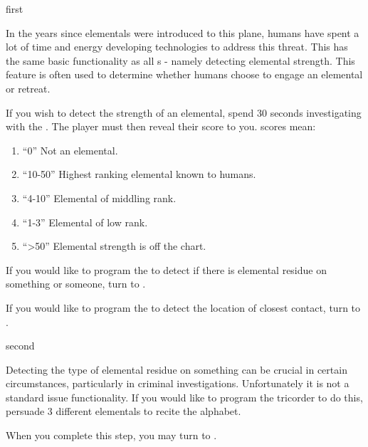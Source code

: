 \documentclass[notebook]{elementals}
\begin{document}

\startnotebook{\nTricorder{}}

\begin{page}{first}

In the years since elementals were introduced to this plane, humans have spent a lot of time and energy developing technologies to address this threat. This \iTricorder{} has the same basic functionality as all \iTricorder{}s - namely detecting elemental strength. This feature is often used to determine whether humans choose to engage an elemental or retreat.

If you wish to detect the strength of an elemental, spend 30 seconds investigating with the \iTricorder{}. The player must then reveal their \beta score to you. \beta scores mean:
\begin{enumerate}
  \item ``0'' Not an elemental.
  \item ``10-50'' Highest ranking elemental known to humans.
  \item ``4-10'' Elemental of middling rank.
  \item ``1-3'' Elemental of low rank.
  \item ``>50'' Elemental strength is off the chart.
\end{enumerate}

If you would like to program the \iTricorder{} to detect if there is elemental residue on something or someone, turn to .

If you would like to program the \iTricorder{} to detect the location of closest contact, turn to .

\end{page}

\begin{page}{second}

Detecting the type of elemental residue on something can be crucial in certain circumstances, particularly in criminal investigations. Unfortunately it is not a standard issue functionality. If you would like to program the tricorder to do this, persuade 3 different elementals to recite the alphabet.

When you complete this step, you may turn to .

\end{page}
\end{document}
